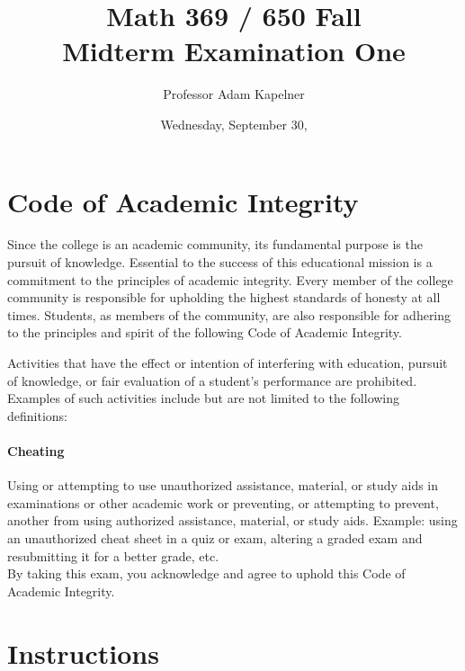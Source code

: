 \documentclass[12pt,landscape]{article}
\title{Math 369 / 650 Fall \the\year{} \\ Midterm Examination One}
\author{Professor Adam Kapelner}
\date{Wednesday, September 30, \the\year{}}
\begin{document}
\maketitle


\thispagestyle{empty}

\section*{Code of Academic Integrity}

\footnotesize
Since the college is an academic community, its fundamental purpose is the pursuit of knowledge. Essential to the success of this educational mission is a commitment to the principles of academic integrity. Every member of the college community is responsible for upholding the highest standards of honesty at all times. Students, as members of the community, are also responsible for adhering to the principles and spirit of the following Code of Academic Integrity.

Activities that have the effect or intention of interfering with education, pursuit of knowledge, or fair evaluation of a student's performance are prohibited. Examples of such activities include but are not limited to the following definitions:

\paragraph{Cheating} Using or attempting to use unauthorized assistance, material, or study aids in examinations or other academic work or preventing, or attempting to prevent, another from using authorized assistance, material, or study aids. Example: using an unauthorized cheat sheet in a quiz or exam, altering a graded exam and resubmitting it for a better grade, etc.
\\

\noindent By taking this exam, you acknowledge and agree to uphold this Code of Academic Integrity. \\


\normalsize

\section*{Instructions}
\end{document}
